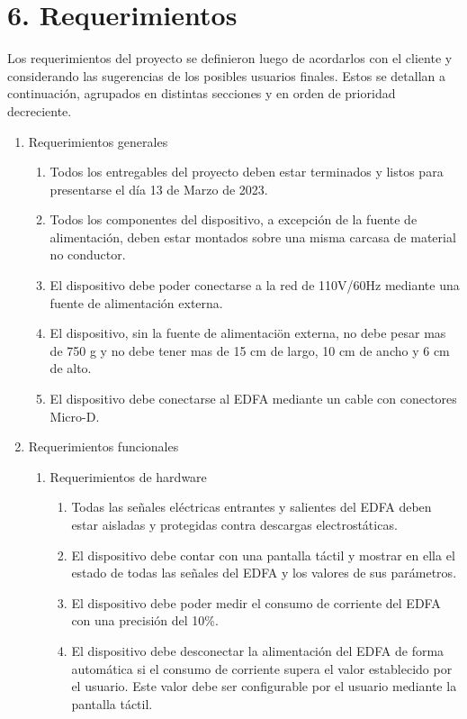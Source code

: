 \documentclass[
11pt, %
codirector, %
]{charter}
\begin{document}
\section{6. Requerimientos}
\label{sec:requerimientos}

Los requerimientos del proyecto se definieron luego de acordarlos con el cliente y considerando las sugerencias de los posibles usuarios finales. Estos se detallan a continuación, agrupados en distintas secciones y en orden de prioridad decreciente.

\begin{enumerate}
	\item Requerimientos generales
		\begin{enumerate}
			\item Todos los entregables del proyecto deben estar terminados y listos para presentarse el día 13 de Marzo de 2023.
			\item Todos los componentes del dispositivo, a excepción de la fuente de alimentación, deben estar montados sobre una misma carcasa de material no conductor.
			\item El dispositivo debe poder conectarse a la red de 110V/60Hz mediante una fuente de alimentación externa.
			\item El dispositivo, sin la fuente de alimentaciön externa, no debe pesar mas de 750 g y no debe tener mas de 15 cm de largo, 10 cm de ancho y 6 cm de alto.
			\item El dispositivo debe conectarse al EDFA mediante un cable con conectores Micro-D.
		\end{enumerate}
	\item Requerimientos funcionales
		\begin{enumerate}
			\item Requerimientos de hardware
				\begin{enumerate}[label*=\arabic*.]
					\item Todas las señales eléctricas entrantes y salientes del EDFA deben estar aisladas y protegidas contra descargas electrostáticas.
					\item El dispositivo debe contar con una pantalla táctil y mostrar en ella el estado de todas las señales del EDFA y los valores de sus parámetros.
					\item El dispositivo debe poder medir el consumo de corriente del EDFA con una precisión del 10\%.
					\item El dispositivo debe desconectar la alimentación del EDFA de forma automática si el consumo de corriente supera el valor establecido por el usuario. Este valor debe ser configurable por el usuario mediante la pantalla táctil.

\end{enumerate}
\end{enumerate}
\end{enumerate}
\end{document}
